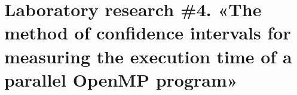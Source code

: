 { %
	\section{Laboratory research \#4. «The method of confidence intervals for measuring the execution time of a parallel OpenMP program»}
	
	
	
}
